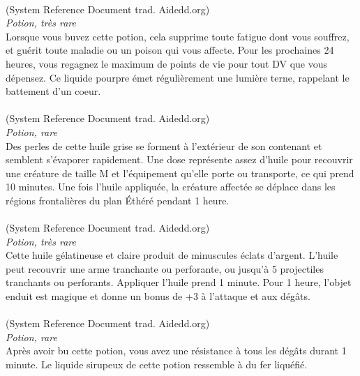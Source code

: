 \\
{\small (System Reference Document trad. Aidedd.org)}\\
{\small \it Potion, très rare}\\
Lorsque vous buvez cette potion, cela supprime toute fatigue dont vous souffrez, et guérit toute maladie ou un poison qui vous affecte. Pour les prochaines 24 heures, vous regagnez le maximum de points de vie pour tout DV que vous dépensez. Ce liquide pourpre émet régulièrement une lumière terne, rappelant le battement d'un coeur. \\

\\
{\small (System Reference Document trad. Aidedd.org)}\\
{\small \it Potion, rare}\\
Des perles de cette huile grise se forment à l'extérieur de son contenant et semblent s'évaporer rapidement.
Une dose représente assez d'huile pour recouvrir une créature de taille M et l'équipement qu'elle porte ou transporte, ce qui prend 10 minutes. Une fois l'huile appliquée, la créature affectée se déplace dans les régions frontalières du plan Éthéré pendant 1 heure. \\

\\
{\small (System Reference Document trad. Aidedd.org)}\\
{\small \it Potion, très rare}\\
Cette huile gélatineuse et claire produit de minuscules éclats d'argent. L’huile peut recouvrir une arme tranchante ou perforante, ou jusqu'à 5 projectiles tranchants ou perforants. Appliquer l’huile prend 1 minute. Pour 1 heure, l’objet enduit est magique et donne un bonus de +3 à l’attaque et aux dégâts. \\

\\
{\small (System Reference Document trad. Aidedd.org)}\\
{\small \it Potion, rare}\\
Après avoir bu cette potion, vous avez une résistance à tous les dégâts durant 1 minute. Le liquide sirupeux de cette potion ressemble à du fer liquéfié. \\


